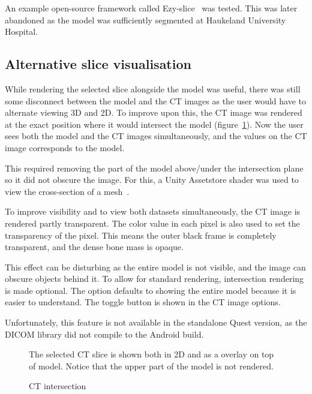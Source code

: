 \documentclass[a4paper]{report}
\begin{document}
An example open-source framework called Ezy-slice~\cite{arayan_davidarayanezy-slice_2022} was tested. This was later abandoned as the model was sufficiently segmented at Haukeland University Hospital.

\subsection{Alternative slice visualisation}
While rendering the selected slice alongside the model was useful, there was still some disconnect between the model and the CT images as the user would have to alternate viewing 3D and 2D.
To improve upon this, the CT image was rendered at the exact position where it would intersect the model (figure~\ref{intersection}). Now the user sees both the model and the CT images simultaneously, and the values on the CT image corresponds to the model.

This required removing the part of the model above/under the intersection plane so it did not obscure the image. For this, a Unity Assetstore shader was used to view the cross-section of a mesh~\cite{aldandarawy_unity_2019}.

To improve visibility and to view both datasets simultaneously, the CT image is rendered partly transparent. The color value in each pixel is also used to set the transparency of the pixel. This means the outer black frame is completely transparent, and the dense bone mass is opaque.

This effect can be disturbing as the entire model is not visible, and the image can obscure objects behind it. To allow for standard rendering, intersection rendering is made optional. The option defaults to showing the entire model because it is easier to understand.
The toggle button is shown in the CT image options.

Unfortunately, this feature is not available in the standalone Quest version, as the DICOM library did not compile to the Android build.

\begin{figure}[h!]
    \centering
	\hfill
	\caption{CT intersection}\label{intersection}
  \small
  The selected CT slice is shown both in 2D and as a overlay on top of model. Notice that the upper part of the model is not rendered.
\end{figure}
\end{document}
